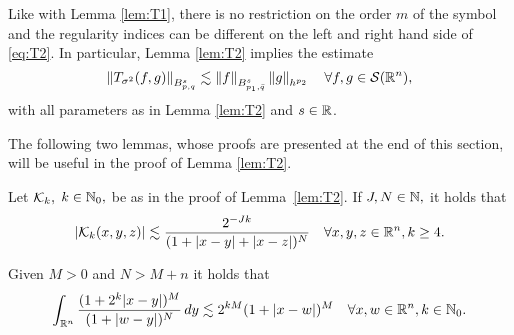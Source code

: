 Like with Lemma \ref{lem:T1}, there is no restriction on the order $m$ of the symbol and the regularity indices can be different on the left and right hand side of \eqref{eq:T2}. In particular, Lemma \ref{lem:T2} implies the estimate
$$
\norm{T_{\sigma^2}(f,g)}{\ibes{p}{s}{q}}  \lesssim \norm{f}{\ibes{p_1}{s}{\bar{q}}} \norm{g}{h^{p_2}} \quad \forall f, g \in \sw,$$
with all parameters as in Lemma \ref{lem:T2} and $s\in\re$. 


The following two lemmas, whose proofs are presented at the end of this section, will be useful in the proof of Lemma \ref{lem:T2}.

\begin{lemma}\label{lem:estimateKk} Let  $\K_k,$ $k\in\na_0,$ be as in the proof of Lemma~\ref{lem:T2}. If $J, N \in \na,$  it holds that 
\begin{equation}\label{eq:estimateKk}
|\K_k(x,y,z)| \lesssim \frac{2^{-Jk}}{(1+ |x-y| + |x-z|)^{N}} \quad \forall x, y, z \in \rn, k \ge 4. 
\end{equation}
\end{lemma}




\begin{lemma}\label{lem:int:M:N:k} Given $M >0$ and $N > M + n$ it holds that
\begin{equation*}
\int_{\rn} \frac{(1+ 2^k |x-y|)^M}{(1+ |w - y|)^N} \dy \lesssim 2^{kM} (1 + |x-w|)^M  \quad \forall x, w \in \rn, k \in \naz.
\end{equation*}
\end{lemma}




